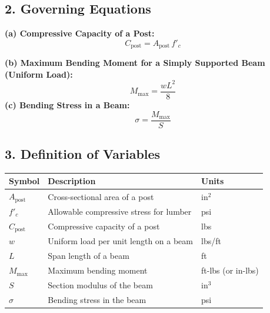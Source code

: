 \documentclass[12pt]{article}
\begin{document}
\subsection*{2. Governing Equations}
\textbf{(a) Compressive Capacity of a Post:}
\begin{equation}
    C_{\text{post}} = A_{\text{post}} \, f'_c
    \tag{1}
\end{equation}

\textbf{(b) Maximum Bending Moment for a Simply Supported Beam (Uniform Load):}
\begin{equation}
    M_{\text{max}} = \frac{w L^2}{8}
    \tag{2}
\end{equation}
\textbf{(c) Bending Stress in a Beam:}
\begin{equation}
    \sigma = \frac{M_{\text{max}}}{S}
    \tag{3}
\end{equation}
\subsection*{3. Definition of Variables}

\begin{center}
\begin{tabular}{@{}lll@{}}
\toprule
\textbf{Symbol} & \textbf{Description} & \textbf{Units} \\ \midrule
\(A_{\text{post}}\) & Cross-sectional area of a post & in\(^2\) \\
\(f'_c\) & Allowable compressive stress for lumber & psi \\
\(C_{\text{post}}\) & Compressive capacity of a post & lbs \\[6pt]
\(w\) & Uniform load per unit length on a beam & lbs/ft \\
\(L\) & Span length of a beam & ft \\
\(M_{\text{max}}\) & Maximum bending moment & ft-lbs (or in-lbs) \\
\(S\) & Section modulus of the beam & in\(^3\) \\
\(\sigma\) & Bending stress in the beam & psi \\ \bottomrule
\end{tabular}
\end{center}
\end{document}
